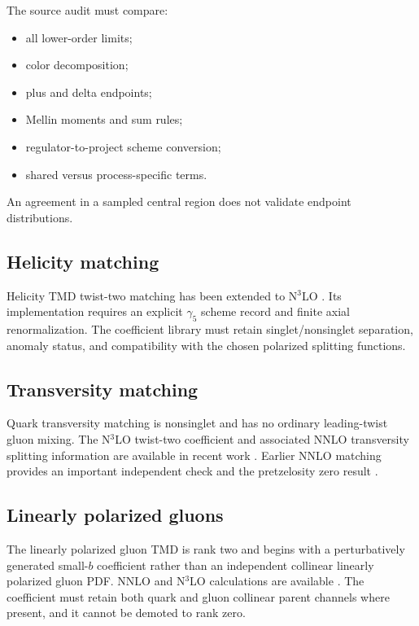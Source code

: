 \documentclass[11pt]{article}
\begin{document}
The source audit must compare:
\begin{itemize}
\item all lower-order limits;
\item color decomposition;
\item plus and delta endpoints;
\item Mellin moments and sum rules;
\item regulator-to-project scheme conversion;
\item shared versus process-specific terms.
\end{itemize}
An agreement in a sampled central region does not validate endpoint distributions.

\subsection{Helicity matching}

Helicity TMD twist-two matching has been extended to N\(^3\)LO \cite{ZhuHelicity2025}.  Its implementation requires an explicit \(\gamma_5\) scheme record and finite axial renormalization.  The coefficient library must retain singlet/nonsinglet separation, anomaly status, and compatibility with the chosen polarized splitting functions.

\subsection{Transversity matching}

Quark transversity matching is nonsinglet and has no ordinary leading-twist gluon mixing.  The N\(^3\)LO twist-two coefficient and associated NNLO transversity splitting information are available in recent work \cite{ZhuTransversity2025}.  Earlier NNLO matching provides an important independent check and the pretzelosity zero result \cite{GutierrezReyesScimemiVladimirov2018}.

\subsection{Linearly polarized gluons}

The linearly polarized gluon TMD is rank two and begins with a perturbatively generated small-\(b\) coefficient rather than an independent collinear linearly polarized gluon PDF.  NNLO and N\(^3\)LO calculations are available \cite{LuoGluon2020,ZhuLinearGluon2025}.  The coefficient must retain both quark and gluon collinear parent channels where present, and it cannot be demoted to rank zero.
\end{document}
